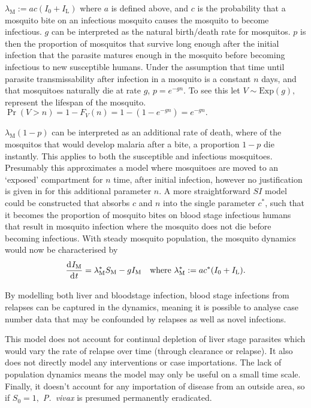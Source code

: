 $\lambda_\mathrm{M} := ac(I_0 + I_\mathrm{L})$ where $a$ is defined above, and $c$ is the probability that a mosquito bite on an infectious mosquito causes the mosquito to become infectious. $g$ can be interpreted as the natural birth/death rate for mosquitos. $p$ is then the proportion of mosquitos that survive long enough after the initial infection that the parasite matures enough in the mosquito before becoming infectious to new susceptible humans. Under the assumption that time until parasite transmissability after infection in a mosquito is a constant $n$ days, and that mosquitoes naturally die at rate $g$, $p=e^{-gn}.$ To see this let $V\sim\mathrm{Exp}(g),$ represent the lifespan of the mosquito. $\Pr(V > n)= 1 - F_V(n) = 1 - (1 - e^{-gn}) = e^{-gn}.$

$\lambda_\mathrm{M}(1 - p)$ can be interpreted as an additional rate of death, where of the mosquitos that would develop malaria after a bite, a proportion $1 - p$ die instantly. This applies to both the susceptible and infectious mosquitoes. Presumably this approximates a model where mosquitoes are moved to an `exposed' compartment for $n$ time, after initial infection, however no justification is given in \parencite{white_variation_2016} for this additional parameter $n$. A more straightforward $SI$ model could be constructed that absorbs $c$ and $n$ into the single parameter $c^*$, such that it becomes the proportion of mosquito bites on blood stage infectious humans that result in mosquito infection where the mosquito does not die before becoming infectious. With steady mosquito population, the mosquito dynamics would now be characterised by
$$\frac{\diff I_\mathrm{M}}{\diff t} = \lambda_\mathrm{M}^*S_\mathrm{M}- gI_\mathrm{M}\quad\text{where } \lambda_\mathrm{M}^*:= ac^*(I_0 + I_\mathrm{L}).$$

By modelling both liver and bloodstage infection, blood stage infections from relapses can be captured in the dynamics, meaning it is possible to analyse case number data that may be confounded by relapses as well as novel infections.


This model does not account for continual depletion of liver stage parasites which would vary the rate of relapse over time (through clearance or relapse). It also does not directly model any interventions or case importations. The lack of population dynamics means the model may only be useful on a small time scale. Finally, it doesn't account for any importation of disease from an outside area, so if $S_0 = 1,$ \textit{P.\ vivax} is presumed permanently eradicated.


